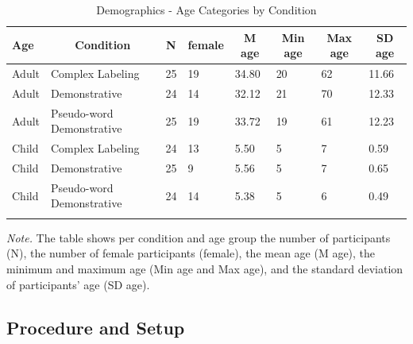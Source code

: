 \documentclass[
  man,floatsintext]{apa6}
\begin{document}
\begin{table}[ht]

\begin{center}
\begin{threeparttable}

\caption{\label{tab:demtab}Demographics - Age Categories by Condition}

\begin{tabular}{llllllll}
\toprule
Age & \multicolumn{1}{c}{Condition} & \multicolumn{1}{c}{N} & \multicolumn{1}{c}{female} & \multicolumn{1}{c}{M age} & \multicolumn{1}{c}{Min age} & \multicolumn{1}{c}{Max age} & \multicolumn{1}{c}{SD age}\\
\midrule
Adult & Complex Labeling & 25 & 19 & 34.80 & 20 & 62 & 11.66\\
Adult & Demonstrative & 24 & 14 & 32.12 & 21 & 70 & 12.33\\
Adult & Pseudo-word Demonstrative & 25 & 19 & 33.72 & 19 & 61 & 12.23\\
Child & Complex Labeling & 24 & 13 & 5.50 & 5 & 7 & 0.59\\
Child & Demonstrative & 25 & 9 & 5.56 & 5 & 7 & 0.65\\
Child & Pseudo-word Demonstrative & 24 & 14 & 5.38 & 5 & 6 & 0.49\\
\bottomrule
\addlinespace
\end{tabular}

\begin{tablenotes}[para]
\normalsize{\textit{Note.} The table shows per condition and age group the number of participants (N), the number of female participants (female), the mean age (M age), the minimum and maximum age (Min age and Max age), and the standard deviation of participants' age (SD age).}
\end{tablenotes}

\end{threeparttable}
\end{center}

\end{table}

\subsection{Procedure and Setup}\label{procedure-and-setup}
\end{document}
